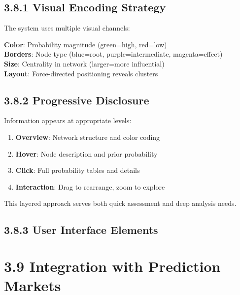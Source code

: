 \documentclass[
  11pt,
  letterpaper,
]{book}
\providecommand{\tightlist}{%
  \setlength{\itemsep}{0pt}\setlength{\parskip}{0pt}}
\begin{document}
\subsection*{3.8.1 Visual Encoding Strategy}\label{sec-visual-encoding}

The system uses multiple visual channels:

\textbf{Color}: Probability magnitude (green=high, red=low)\\
\textbf{Borders}: Node type (blue=root, purple=intermediate,
magenta=effect)\\
\textbf{Size}: Centrality in network (larger=more influential)\\
\textbf{Layout}: Force-directed positioning reveals clusters

\subsection*{3.8.2 Progressive
Disclosure}\label{sec-progressive-disclosure}

Information appears at appropriate levels:

\begin{enumerate}
\def\labelenumi{\arabic{enumi}.}
\tightlist
\item
  \textbf{Overview}: Network structure and color coding
\item
  \textbf{Hover}: Node description and prior probability
\item
  \textbf{Click}: Full probability tables and details
\item
  \textbf{Interaction}: Drag to rearrange, zoom to explore
\end{enumerate}

This layered approach serves both quick assessment and deep analysis
needs.

\subsection*{3.8.3 User Interface Elements}\label{sec-ui-elements}

\section*{3.9 Integration with Prediction
Markets}\label{sec-market-integration}
\end{document}
